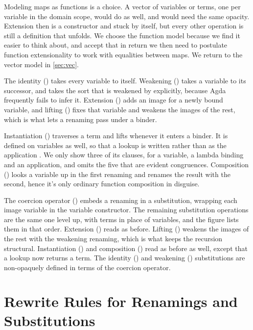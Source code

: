 \documentclass[sigplan,anonymous,review]{acmart}
\theoremstyle{acmdefinition}
\begin{document}
Modeling maps as functions is a choice. A vector of variables or terms, one per
variable in the domain scope, would do as well, and would need the same
opacity. Extension then is a constructor and stuck by itself, but every other
operation is still a definition that unfolds. We choose the function model
because we find it easier to think about, and accept that in return we then
need to postulate function extensionality to work with equalities between maps.
We return to the vector model in \cref{sec:vec}.

The identity () takes every variable to itself. Weakening
() takes a variable to its successor, and takes the sort that
is weakened by explicitly, because Agda frequently fails to infer it. Extension
() adds an image for a newly bound variable, and lifting
() fixes that variable and weakens the images of the rest,
which is what lets a renaming pass under a binder.

Instantiation () traverses a term and lifts whenever it
enters a binder. It is defined on variables as well, so that a lookup is
written  \AgdaFunction{[}  \AgdaFunction{]ᴿ} rather
than as the application  \AgdaBound{\_} . We only
show three of its clauses, for a variable, a lambda binding and an application,
and omits the five that are evident congruences. Composition
() looks a variable up in the first renaming and renames
the result with the second, hence it's only ordinary function composition in
disguise.

The coercion operator () embeds a renaming in a
substitution, wrapping each image variable in the variable constructor. The
remaining substitution operations are the same one level up, with terms in
place of variables, and the figure lists them in that order. Extension
() reads as before. Lifting ()
weakens the images of the rest with the weakening renaming, which is what keeps
the recursion structural. Instantiation () and
composition () read as before as well, except that a
lookup now returns a term. The identity () and weakening
() substitutions are non-opaquely defined in terms of the
coercion operator.

\section{Rewrite Rules for Renamings and Substitutions}\label{sec:mis}
\end{document}
